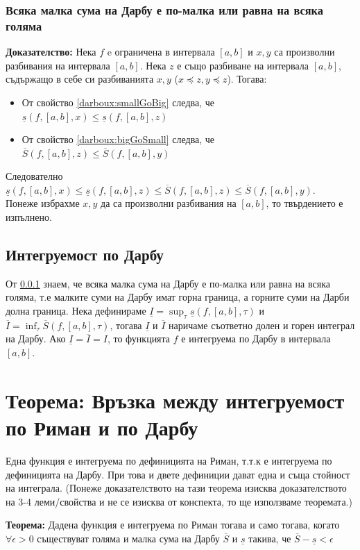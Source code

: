 \documentclass[fleqn,12pt]{article}
\begin{document}
\subsubsection{Всяка малка сума на Дарбу е по-малка или равна на всяка голяма} \label{darboux:smallLtBig}
\textbf{Доказателство: }
Нека $f$ e ограничена в интервала $[a,b]$ и $x,y$ са произволни разбивания на интервала $[a,b]$. Нека $z$ е също разбиване на интервала $[a,b]$,
съдържащо в себе си разбиванията $x,y$ ($x \preceq z, y \preceq z$). Тогава:
\begin{itemize}
    \item От свойство \ref{darboux:smallGoBig} следва, че $\underline{s}(f,[a,b],x) \leq \underline{s}(f,[a,b],z)$
    \item От свойство \ref{darboux:bigGoSmall} следва, че $\overline{S}(f,[a,b],z) \leq \overline{S}(f,[a,b],y)$
\end{itemize}

Следователно $\underline{s}(f,[a,b],x) \leq \underline{s}(f,[a,b],z) \leq \overline{S}(f,[a,b],z) \leq \overline{S}(f,[a,b],y)$.\\
Понеже избрахме $x,y$ да са произволни разбивания на $[a,b]$, то твърдението е изпълнено. 

\subsection{Интегруемост по Дарбу}
От \ref{darboux:smallLtBig} знаем, че всяка малка сума на Дарбу е по-малка или равна на всяка голяма, т.е малките суми на Дарбу имат горна граница, а горните суми на Дарби долна граница.
Нека дефинираме $\underline{I}=\sup_\tau \underline{s}(f,[a,b],\tau)$ и $\overline{I}=\inf_\tau \overline{S}(f,[a,b],\tau)$,
тогава $\underline{I}$ и  $\overline{I}$ наричаме съответно долен и горен интеграл на Дарбу. Ако $\underline{I}=\overline{I}=I$, то функцията $f$ е интегруема по Дарбу в интервала $[a,b]$.

\section{Теорема: Връзка между интегруемост по Риман и по Дарбу}
Една функция е интегруема по дефиницията на Риман, т.т.к е интегруема по дефиницията на Дарбу. При това и двете дефиниции дават една и съща стойност на интеграла.
(Понеже доказателството на тази теорема изисква доказателството на 3-4 леми/свойства и не се изисква от конспекта, то ще използваме теоремата.)

\textbf{Теорема:} Дадена функция е интегруема по Риман тогава и само тогава, когато $\forall\epsilon > 0$ съществуват голяма и малка сума на Дарбу $\overline{S}$ и $\underline{s}$ такива, че $\overline{S}-\underline{s} < \epsilon$
\end{document}
